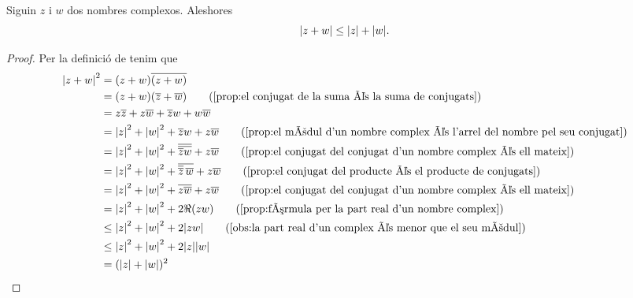 \documentclass[../../Main.tex]{subfiles}
\begin{document}
	\begin{proposition}
        \label{prop:desigualta triangular nombres complexos}
		Siguin \(z\) i \(w\) dos nombres complexos.
        Aleshores
		\[
            \modul{z+w} \leq \modul{z}+\modul{w}.
        \]
		\begin{proof}
			Per la definició de  tenim que
			\begin{align*}
				\modul{z+w}^{2} &= (z+w)\conjugat{(z+w)} \\
                                &= (z+w)(\conjugat{z}+\conjugat{w})
                                \tag{\ref{prop:el conjugat de la suma és la suma de conjugats}} \\
                                &= z\conjugat{z}+z\conjugat{w}
                                   +\conjugat{z}w+w\conjugat{w} \\
                                &= \modul{z}^{2}+\modul{w}^{2}
                                   +\conjugat{z}w+z\conjugat{w}
                                \tag{\ref{prop:el mòdul d'un nombre complex és l'arrel del nombre pel seu conjugat}} \\
                                &= \modul{z}^{2}+\modul{w}^{2}
                                   +\conjugat{\conjugat{\conjugat{z}w}}+z\conjugat{w}
                                   \tag{\ref{prop:el conjugat del conjugat d'un nombre complex és ell mateix}} \\
                                &= \modul{z}^{2}+\modul{w}^{2}
                                   +\conjugat{\conjugat{\conjugat{z}}\,\conjugat{w}}+z\conjugat{w}
                                \tag{\ref{prop:el conjugat del producte és el producte de conjugats}} \\
                                &= \modul{z}^{2}+\modul{w}^{2}
                                   +\conjugat{z\conjugat{w}}+z\conjugat{w}
                                \tag{\ref{prop:el conjugat del conjugat d'un nombre complex és ell mateix}} \\
                                &= \modul{z}^{2}+\modul{w}^{2}+2\Re(zw)
                                \tag{\ref{prop:fórmula per la part real d'un nombre complex}} \\
                                &\leq \modul{z}^{2}+\modul{w}^{2}+2\modul{zw}
                                \tag{\ref{obs:la part real d'un complex és menor que el seu mòdul}} \\
                                &\leq \modul{z}^{2}+\modul{w}^{2}
                                      +2\modul{z}\modul{w} \\
                                &= (\modul{z}+\modul{w})^{2}
			\end{align*}
		\end{proof}
	\end{proposition}
\end{document}
